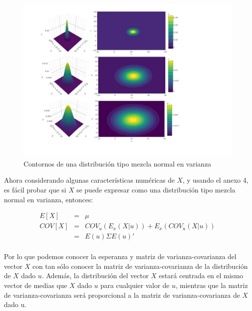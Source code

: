 \begin{figure}[h]
	\centering
	\includegraphics[width=1.15\linewidth]{Figuras/sv1}
	\caption{Contornos de una distribución tipo mezcla normal en varianza}
	\label{fig:contornosv}
\end{figure}
\pagebreak

Ahora considerando algunas características numéricas de $X$, y usando el anexo 4, es fácil probar que si $X$ se puede expresar como una distribución tipo mezcla normal en varianza, entonces: 

\begin{eqnarray}
E[X]&=&\mu \nonumber \\
COV[X]&=&COV_{u}(E_{x}(X|u)) + E_{x}(COV_{u}(X|u)) \nonumber\\
&=&E(u)\Sigma E(u)'\nonumber\\
\end{eqnarray} 

Por lo que podemos conocer la esperanza y matriz de varianza-covarianza del vector $X$ con tan sólo conocer la matriz de varianza-covarianza de la distribución de $X$ dado $u$. Además, la distribución del vector $X$ estará centrada en el mismo vector de medias que $X$ dado $u$ para cualquier valor de $u$, mientras que la matriz de varianza-covarianza será proporcional a la matriz de varianza-covarianza de $X$ dado u.\\

